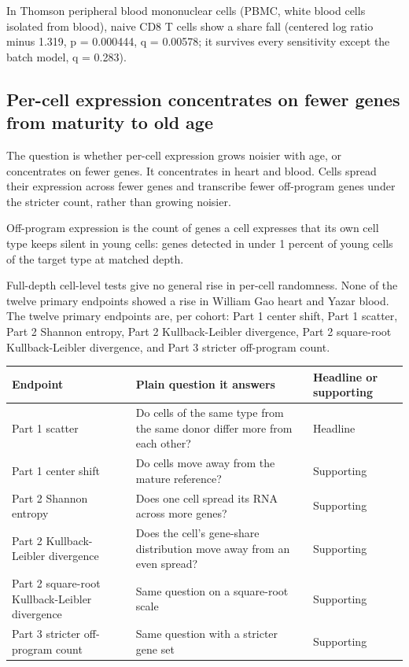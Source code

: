 \documentclass[11pt]{article}
\begin{document}
In Thomson peripheral blood mononuclear cells (PBMC, white blood cells isolated from blood), naive CD8 T cells show a share fall (centered log ratio minus 1.319, p = 0.000444, q = 0.00578; it survives every sensitivity except the batch model, q = 0.283).


\subsection*{Per-cell expression concentrates on fewer genes from maturity to old age}

The question is whether per-cell expression grows noisier with age, or concentrates on fewer genes. It concentrates in heart and blood. Cells spread their expression across fewer genes and transcribe fewer off-program genes under the stricter count, rather than growing noisier.

Off-program expression is the count of genes a cell expresses that its own cell type keeps silent in young cells: genes detected in under 1 percent of young cells of the target type at matched depth.

Full-depth cell-level tests give no general rise in per-cell randomness. None of the twelve primary endpoints showed a rise in William Gao heart and Yazar blood. The twelve primary endpoints are, per cohort: Part 1 center shift, Part 1 scatter, Part 2 Shannon entropy, Part 2 Kullback-Leibler divergence, Part 2 square-root Kullback-Leibler divergence, and Part 3 stricter off-program count.

{\scriptsize\begin{tabular}{p{}p{}p{}}
Endpoint & Plain question it answers & Headline or supporting \\ \hline
Part 1 scatter & Do cells of the same type from the same donor differ more from each other? & Headline \\
Part 1 center shift & Do cells move away from the mature reference? & Supporting \\
Part 2 Shannon entropy & Does one cell spread its RNA across more genes? & Supporting \\
Part 2 Kullback-Leibler divergence & Does the cell's gene-share distribution move away from an even spread? & Supporting \\
Part 2 square-root Kullback-Leibler divergence & Same question on a square-root scale & Supporting \\
Part 3 stricter off-program count & Same question with a stricter gene set & Supporting \\
\end{tabular}}
\end{document}
